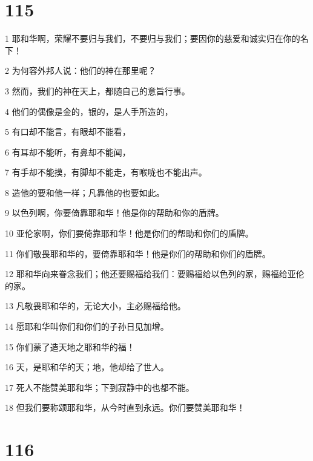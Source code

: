 \chapter{115}

\par 1 耶和华啊，荣耀不要归与我们，不要归与我们；要因你的慈爱和诚实归在你的名下！
\par 2 为何容外邦人说：他们的神在那里呢？
\par 3 然而，我们的神在天上，都随自己的意旨行事。
\par 4 他们的偶像是金的，银的，是人手所造的，
\par 5 有口却不能言，有眼却不能看，
\par 6 有耳却不能听，有鼻却不能闻，
\par 7 有手却不能摸，有脚却不能走，有喉咙也不能出声。
\par 8 造他的要和他一样；凡靠他的也要如此。
\par 9 以色列啊，你要倚靠耶和华！他是你的帮助和你的盾牌。
\par 10 亚伦家啊，你们要倚靠耶和华！他是你们的帮助和你们的盾牌。
\par 11 你们敬畏耶和华的，要倚靠耶和华！他是你们的帮助和你们的盾牌。
\par 12 耶和华向来眷念我们；他还要赐福给我们：要赐福给以色列的家，赐福给亚伦的家。
\par 13 凡敬畏耶和华的，无论大小，主必赐福给他。
\par 14 愿耶和华叫你们和你们的子孙日见加增。
\par 15 你们蒙了造天地之耶和华的福！
\par 16 天，是耶和华的天；地，他却给了世人。
\par 17 死人不能赞美耶和华；下到寂静中的也都不能。
\par 18 但我们要称颂耶和华，从今时直到永远。你们要赞美耶和华！

\chapter{116}

